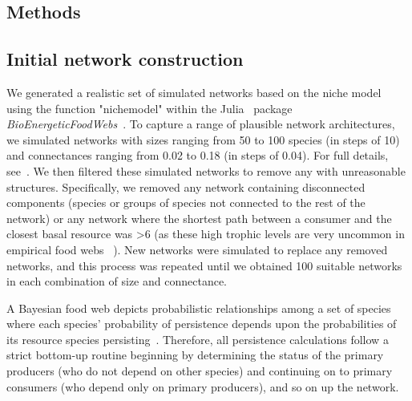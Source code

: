 \documentclass[12pt]{article}
\begin{document}
\begin{spacing}{2.0}

    	
\section*{Methods}

	\subsection*{Initial network construction}

		We generated a realistic set of simulated networks based on the niche model~\citep{Williams2000,Stouffer2007} using the function "nichemodel" within the Julia~\citep{Julia} package \emph{BioEnergeticFoodWebs}~\citep{bioenergfw,Delmas2017}. 
		To capture a range of plausible network architectures, we simulated networks with sizes ranging from 50 to 100 species (in steps of 10) and connectances ranging from 0.02 to 0.18 (in steps of 0.04). 
		For full details, see~\citet{Cirtwill2021_inprep}.
        We then filtered these simulated networks to remove any with unreasonable structures.
		Specifically, we removed any network containing disconnected components (species or groups of species not connected to the rest of the network) or any network where the shortest path between a consumer and the closest basal resource was \textgreater6 (as these high trophic levels are very uncommon in empirical food webs ~\citep{}).
		New networks were simulated to replace any removed networks, and this process was repeated until we obtained 100 suitable networks in each combination of size and connectance.
              
		A Bayesian food web depicts probabilistic relationships among a set of species where each species' probability of persistence depends upon the probabilities of its resource species persisting~\citep{Jensen_Nielsen,Eklof2013}. 
		Therefore, all persistence calculations follow a strict bottom-up routine beginning by determining the status of the primary producers (who do not depend on other species) and continuing on to primary consumers (who depend only on primary producers), and so on up the network.
		

\end{spacing}
\end{document}
